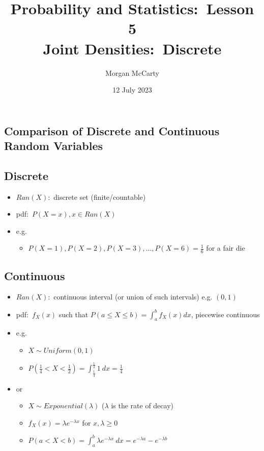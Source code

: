 \documentclass[12pt]{article}
\title{
    Probability and Statistics:\ Lesson 5
    \\Joint Densities:\ Discrete}
\author{Morgan McCarty}
\date{12 July 2023}
\begin{document}
    \maketitle

    \subsection{Comparison of Discrete and Continuous Random Variables}
        \subsection{Discrete}
            \begin{itemize}
                \item $Ran(X)$:\ discrete set (finite/countable)
                \item pdf:\ $P(X = x), x \in Ran(X)$
                \item e.g.
                \begin{itemize}
                    \item $P(X = 1), P(X = 2), P(X = 3), \ldots, P(X = 6) = \frac{1}{6}$ for a fair die
                \end{itemize}
            \end{itemize}
        \subsection{Continuous}
            \begin{itemize}
                \item $Ran(X)$:\ continuous interval (or union of such intervals) e.g. $(0, 1)$
                \item pdf:\ $f_X(x)$ such that $P(a \leq X \leq b) = \int_{a}^{b} f_X(x) dx$, piecewise continuous
                \item e.g.
                \begin{itemize}
                    \item $X \sim Uniform(0, 1)$
                    \item $P(\frac{1}{4} < X < \frac{1}{2}) = \int_{\frac{1}{4}}^{\frac{1}{2}} 1\ dx = \frac{1}{4}$
                \end{itemize}
                \item or
                \begin{itemize}
                    \item $X \sim Exponential(\lambda)$ ($\lambda$ is the rate of decay)
                    \item $f_X(x) = \lambda e^{-\lambda x}$ for $x, \lambda \geq 0$
                    \item $P(a < X < b) = \int_{a}^{b} \lambda e^{-\lambda x}\ dx = e^{-\lambda a} - e^{-\lambda b}$
                \end{itemize}
            \end{itemize}
\end{document}
